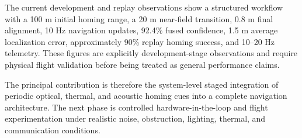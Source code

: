\documentclass[conference]{IEEEtran}
\begin{document}
The current development and replay observations show a structured workflow
with a 100 m initial homing range, a 20 m near-field transition, 0.8 m final
alignment, 10 Hz navigation updates, 92.4\% fused confidence, 1.5 m average
localization error, approximately 90\% replay homing success, and 10--20 Hz
telemetry. These figures are explicitly development-stage observations and
require physical flight validation before being treated as general performance
claims.

The principal contribution is therefore the system-level staged integration of
periodic optical, thermal, and acoustic homing cues into a complete navigation
architecture. The next phase is controlled hardware-in-the-loop and flight
experimentation under realistic noise, obstruction, lighting, thermal, and
communication conditions.





\balance
\end{document}
